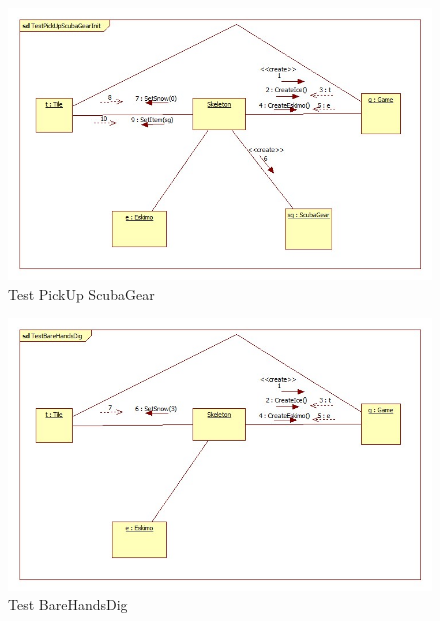 \begin{figure}[H]
	\begin{center}
		\includegraphics[width=17cm]{chapters/chapter05/diagrams/TestPickUpScubaGearInit.jpg}
		\caption{Test PickUp ScubaGear}
		\label{fig:Test PickUp ScubaGear}
	\end{center}
\end{figure}

\begin{figure}[H]
	\begin{center}
		\includegraphics[width=17cm]{chapters/chapter05/diagrams/TestBareHandsDigInit.jpg}
		\caption{Test BareHandsDig}
		\label{fig:Test BareHandsDig}
	\end{center}
\end{figure}

